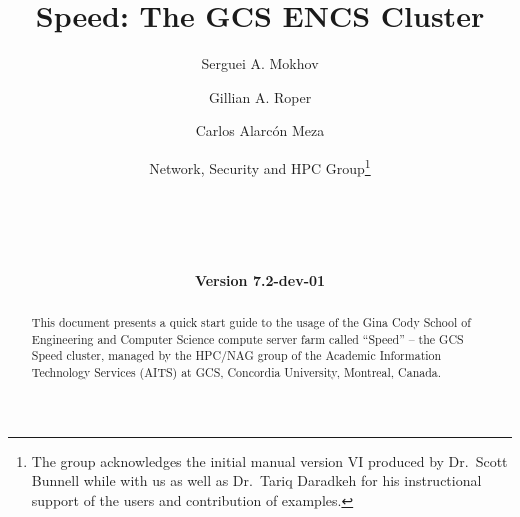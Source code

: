 \documentclass{easychair}
\begin{document}
%
\title{Speed: The GCS ENCS Cluster}

%

\date{\textbf{Version 7.2-dev-01}}

%
\author{
    Serguei A. Mokhov
\and
    Gillian A. Roper
\and
    Carlos Alarcón Meza
\and
    Network, Security and HPC Group\footnote{The group acknowledges the initial manual version VI produced by Dr.~Scott Bunnell while with us
		as well as Dr.~Tariq Daradkeh for his instructional support of the users and contribution of examples.}\\
    \\
    \\
    \\
    \\
}

%

\maketitle

\begin{abstract}
This document presents a quick start guide to the usage of the Gina Cody School 
of Engineering and Computer Science compute server farm called ``Speed'' -- the 
GCS Speed cluster, managed by the HPC/NAG group of the Academic Information 
Technology Services (AITS) at GCS, Concordia University, Montreal, Canada.
\end{abstract}
\end{document}
